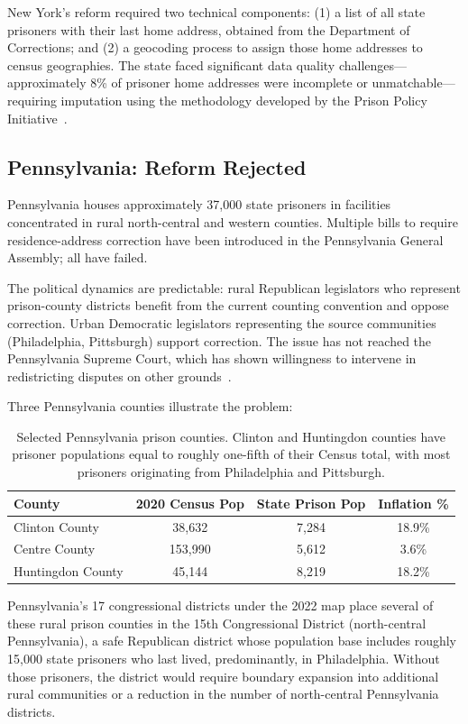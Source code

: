 New York's reform required two technical components: (1) a list of all state prisoners with their last home address, obtained from the Department of Corrections; and (2) a geocoding process to assign those home addresses to census geographies. The state faced significant data quality challenges---approximately 8\% of prisoner home addresses were incomplete or unmatchable---requiring imputation using the methodology developed by the Prison Policy Initiative~\citep{PPI2020}.

\subsection{Pennsylvania: Reform Rejected}

Pennsylvania houses approximately 37,000 state prisoners in facilities concentrated in rural north-central and western counties. Multiple bills to require residence-address correction have been introduced in the Pennsylvania General Assembly; all have failed.

The political dynamics are predictable: rural Republican legislators who represent prison-county districts benefit from the current counting convention and oppose correction. Urban Democratic legislators representing the source communities (Philadelphia, Pittsburgh) support correction. The issue has not reached the Pennsylvania Supreme Court, which has shown willingness to intervene in redistricting disputes on other grounds~\citep{comwlthpa2018}.

Three Pennsylvania counties illustrate the problem:

\begin{table}[h]
\centering
\begin{tabular}{lccc}
\toprule
\textbf{County} & \textbf{2020 Census Pop} & \textbf{State Prison Pop} & \textbf{Inflation \%} \\
\midrule
Clinton County & 38,632 & 7,284 & 18.9\% \\
Centre County & 153,990 & 5,612 & 3.6\% \\
Huntingdon County & 45,144 & 8,219 & 18.2\% \\
\bottomrule
\end{tabular}
\caption{Selected Pennsylvania prison counties. Clinton and Huntingdon counties have prisoner populations equal to roughly one-fifth of their Census total, with most prisoners originating from Philadelphia and Pittsburgh.}
\label{tab:pa-counties}
\end{table}

Pennsylvania's 17 congressional districts under the 2022 map place several of these rural prison counties in the 15th Congressional District (north-central Pennsylvania), a safe Republican district whose population base includes roughly 15,000 state prisoners who last lived, predominantly, in Philadelphia. Without those prisoners, the district would require boundary expansion into additional rural communities or a reduction in the number of north-central Pennsylvania districts.

